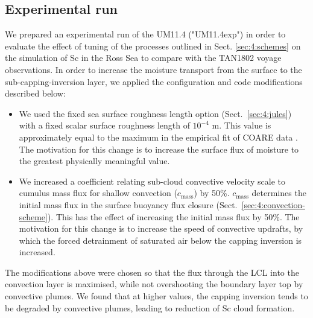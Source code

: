 \subsection{Experimental run}
\label{sec:4:experimental-run}

We prepared an experimental run of the UM11.4 ("UM11.4exp") in order
to evaluate the effect of tuning of the processes outlined in Sect.
\ref{sec:4:schemes} on the simulation of Sc in the Ross Sea to compare
with the TAN1802 voyage observations.
In order to increase the moisture transport from the surface to the sub-capping-inversion layer, we applied the configuration and code modifications described below:

\begin{itemize}
\item We used the fixed sea surface roughness length option
(Sect.~\ref{sec:4:jules}) with a fixed scalar surface roughness length of $10^{-4}$
m. This value is approximately equal to the maximum in the empirical
fit of COARE data \citep{fairall2003}. The motivation for this change is to increase
the surface flux of moisture to the greatest physically meaningful value.
\item We increased a coefficient relating sub-cloud convective velocity scale
to cumulus mass flux for shallow convection ($c_\text{mass}$) by 50\%.
$c_\text{mass}$ determines the initial mass flux in the surface buoyancy
flux closure (Sect.~\ref{sec:4:convection-scheme}). This has the effect
of increasing the initial mass flux by 50\%. The motivation for this change
is to increase the speed of convective updrafts, by which the forced
detrainment of saturated air below the capping inversion is increased.
\end{itemize}

The modifications above were chosen so that the flux through the LCL
into the convection layer is maximised, while not overshooting the boundary
layer top by convective plumes. We found that at higher values, the capping
inversion tends to be degraded by convective plumes, leading to reduction
of Sc cloud formation.

